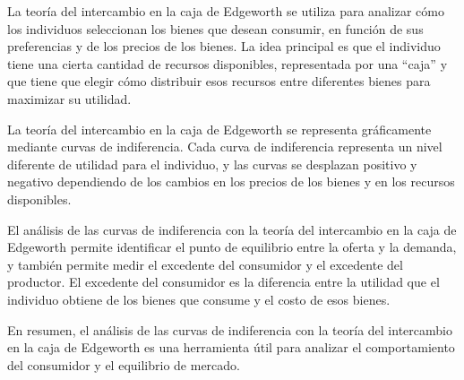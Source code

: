 \documentclass[
  spanish,
  12pt,
]{book}
\begin{document}
La teoría del intercambio en la caja de Edgeworth se utiliza para
analizar cómo los individuos seleccionan los bienes que desean consumir,
en función de sus preferencias y de los precios de los bienes. La idea
principal es que el individuo tiene una cierta cantidad de recursos
disponibles, representada por una ``caja'' y que tiene que elegir cómo
distribuir esos recursos entre diferentes bienes para maximizar su
utilidad.

La teoría del intercambio en la caja de Edgeworth se representa
gráficamente mediante curvas de indiferencia. Cada curva de indiferencia
representa un nivel diferente de utilidad para el individuo, y las
curvas se desplazan positivo y negativo dependiendo de los cambios en
los precios de los bienes y en los recursos disponibles.

El análisis de las curvas de indiferencia con la teoría del intercambio
en la caja de Edgeworth permite identificar el punto de equilibrio entre
la oferta y la demanda, y también permite medir el excedente del
consumidor y el excedente del productor. El excedente del consumidor es
la diferencia entre la utilidad que el individuo obtiene de los bienes
que consume y el costo de esos bienes.

En resumen, el análisis de las curvas de indiferencia con la teoría del
intercambio en la caja de Edgeworth es una herramienta útil para
analizar el comportamiento del consumidor y el equilibrio de mercado.

\newpage
\end{document}

